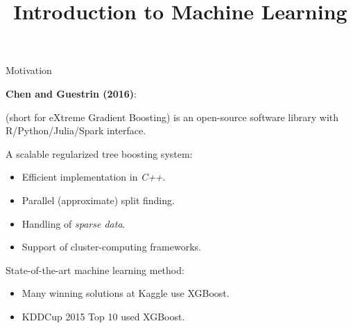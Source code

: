  






\newcommand{\titlefigure}{figure_man/split-finding02.png}
\newcommand{\learninggoals}{
  \item \textcolor{blue}{XXX}
  \item \textcolor{blue}{XXX}
}

\title{Introduction to Machine Learning}
\date{}





\begin{vbframe}{Motivation}

\textbf{Chen and Guestrin (2016)}:

 (short for eXtreme Gradient Boosting) is an open-source software
library with R/Python/Julia/Spark interface.

\lz

A scalable regularized tree boosting system:
\begin{itemize}
  \item Efficient implementation in \emph{C++}.
  \item Parallel (approximate) split finding.
  \item Handling of \emph{sparse data}.
  \item Support of cluster-computing frameworks.
\end{itemize}

\lz

State-of-the-art machine learning method:
\begin{itemize}
  \item Many winning solutions at Kaggle use XGBoost.
  \item KDDCup 2015 Top 10 used XGBoost.
\end{itemize}

\end{vbframe}

